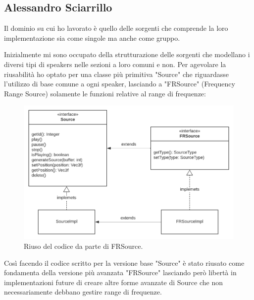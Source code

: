 \documentclass[a4paper,12pt]{report}
\begin{document}
\subsection{Alessandro Sciarrillo}
Il dominio su cui ho lavorato è quello delle sorgenti che comprende la loro implementazione sia come singole ma anche come gruppo.

Inizialmente mi sono occupato della strutturazione delle sorgenti che modellano i diversi tipi di speakers nelle sezioni a loro comuni e non. Per agevolare la riusabilità ho optato per una classe più primitiva "Source" che riguardasse l'utilizzo di base comune a ogni speaker, lasciando a "FRSource" (Frequency Range Source) solamente le funzioni relative al range di frequenze:
%
\begin{figure}[H]
\centering{}
\includegraphics[width=\textwidth]{img/source/Source-FRSource.png}
\caption{Riuso del codice da parte di FRSource.}
\label{img:sourcesAndFRSource}
\end{figure}

Così facendo il codice scritto per la versione base "Source" è stato riusato come fondamenta della versione più avanzata "FRSource"
lasciando però libertà in implementazioni future di creare altre forme avanzate di Source che non necessariamente debbano gestire
range di frequenze.
\end{document}
